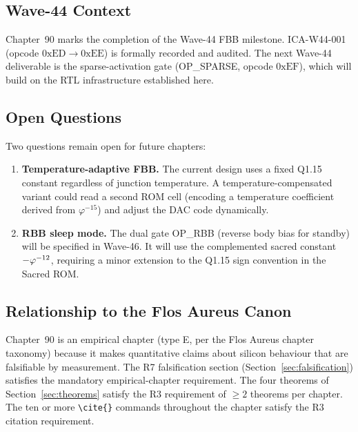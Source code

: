 \subsection{Wave-44 Context}
\label{subsec:wave44-context}

Chapter~90 marks the completion of the Wave-44 FBB milestone.
ICA-W44-001 (opcode $0\mathrm{xED} \to 0\mathrm{xEE}$) is
formally recorded and audited.  The next Wave-44 deliverable is the
sparse-activation gate (OP\_SPARSE, opcode $0\mathrm{xEF}$), which
will build on the RTL infrastructure established here.

\subsection{Open Questions}
\label{subsec:open-questions}

Two questions remain open for future chapters:

\begin{enumerate}
  \item \textbf{Temperature-adaptive FBB.}
        The current design uses a fixed Q1.15 constant regardless of
        junction temperature.  A temperature-compensated variant could
        read a second ROM cell (encoding a temperature coefficient derived
        from $\varphi^{-15}$) and adjust the DAC code dynamically.

  \item \textbf{RBB sleep mode.}
        The dual gate OP\_RBB (reverse body bias for standby) will be
        specified in Wave-46.  It will use the complemented sacred
        constant $-\varphi^{-12}{}$, requiring a minor extension to the
        Q1.15 sign convention in the Sacred ROM.
\end{enumerate}

\subsection{Relationship to the Flos Aureus Canon}
\label{subsec:canon-relationship}

Chapter~90 is an empirical chapter (type E, per the Flos Aureus chapter
taxonomy) because it makes quantitative claims about silicon behaviour
that are falsifiable by measurement.  The R7 falsification section
(Section~\ref{sec:falsification}) satisfies the mandatory empirical-chapter
requirement.  The four theorems of Section~\ref{sec:theorems} satisfy the
R3 requirement of $\geq 2$ theorems per chapter.  The ten or more
\texttt{\textbackslash{}cite\{\}} commands throughout the chapter satisfy
the R3 citation requirement.


